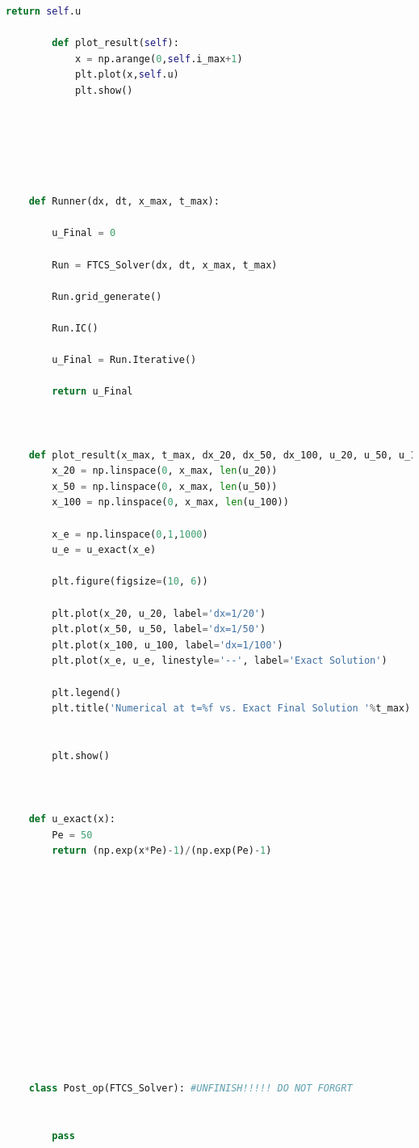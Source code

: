 \documentclass[12pt]{article}
\begin{document}
\begin{scriptsize}
\begin{lstlisting}[language=python,caption={Problem1, Py code for FTCS Solver}]
            return self.u
        
        def plot_result(self):
            x = np.arange(0,self.i_max+1)
            plt.plot(x,self.u)
            plt.show()
    
    
    
        
    
    
    def Runner(dx, dt, x_max, t_max):
    
        u_Final = 0
    
        Run = FTCS_Solver(dx, dt, x_max, t_max)
    
        Run.grid_generate()
    
        Run.IC()
    
        u_Final = Run.Iterative()
    
        return u_Final
    
    
    
    def plot_result(x_max, t_max, dx_20, dx_50, dx_100, u_20, u_50, u_100):
        x_20 = np.linspace(0, x_max, len(u_20))
        x_50 = np.linspace(0, x_max, len(u_50))
        x_100 = np.linspace(0, x_max, len(u_100))
    
        x_e = np.linspace(0,1,1000)
        u_e = u_exact(x_e)
    
        plt.figure(figsize=(10, 6))
    
        plt.plot(x_20, u_20, label='dx=1/20')
        plt.plot(x_50, u_50, label='dx=1/50')
        plt.plot(x_100, u_100, label='dx=1/100')
        plt.plot(x_e, u_e, linestyle='--', label='Exact Solution')
    
        plt.legend()
        plt.title('Numerical at t=%f vs. Exact Final Solution '%t_max)
    
    
        plt.show()
    
    
    
    def u_exact(x):
        Pe = 50
        return (np.exp(x*Pe)-1)/(np.exp(Pe)-1)
    
    
    
        
    
    
        
        
    
        
    
    
        
    
    class Post_op(FTCS_Solver): #UNFINISH!!!!! DO NOT FORGRT
        
    
        pass
    
            
    
    
    

\end{lstlisting}
\end{scriptsize}
\end{document}
